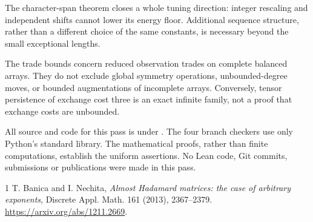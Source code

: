 \documentclass[11pt]{article}
\begin{document}
The character-span theorem closes a whole tuning direction: integer
rescaling and independent shifts cannot lower its energy floor.
Additional sequence structure, rather than a different choice of the
same constants, is necessary beyond the small exceptional lengths.

The trade bounds concern reduced observation trades on complete
balanced arrays. They do not exclude global symmetry operations,
unbounded-degree moves, or bounded augmentations of incomplete arrays.
Conversely, tensor persistence of exchange cost three is an exact
infinite family, not a proof that exchange costs are unbounded.

All source and code for this pass is under
. The four branch checkers use
only Python's standard library. The mathematical proofs, rather than
finite computations, establish the uniform assertions. No Lean code,
Git commits, submissions or publications were made in this pass.
\begin{thebibliography}{1}
 T. Banica and I. Nechita,
\emph{Almost Hadamard matrices: the case of arbitrary exponents},
Discrete Appl. Math. 161 (2013), 2367--2379.
\url{https://arxiv.org/abs/1211.2669}.
\end{thebibliography}
\end{document}

